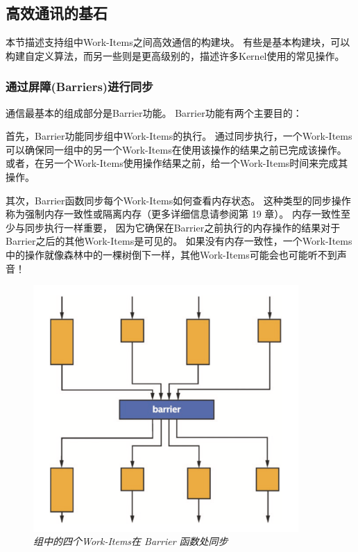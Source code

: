 \subsection{高效通讯的基石}
本节描述支持组中Work-Items之间高效通信的构建块。 
有些是基本构建块，可以构建自定义算法，而另一些则是更高级别的，描述许多Kernel使用的常见操作。

\subsubsection{通过屏障(Barriers)进行同步}
通信最基本的组成部分是Barrier功能。 Barrier功能有两个主要目的：

首先，Barrier功能同步组中Work-Items的执行。 
通过同步执行，一个Work-Items可以确保同一组中的另一个Work-Items在使用该操作的结果之前已完成该操作。 
或者，在另一个Work-Items使用操作结果之前，给一个Work-Items时间来完成其操作。

其次，Barrier函数同步每个Work-Items如何查看内存状态。 
这种类型的同步操作称为强制内存一致性或隔离内存（更多详细信息请参阅第 19 章）。 
内存一致性至少与同步执行一样重要，
因为它确保在Barrier之前执行的内存操作的结果对于Barrier之后的其他Work-Items是可见的。 
如果没有内存一致性，一个Work-Items中的操作就像森林中的一棵树倒下一样，其他Work-Items可能会也可能听不到声音！

\begin{figure}[H]
	\centering
	\includegraphics[width=0.9\textwidth]{figs/F9.2.png}
	\caption{\textit{组中的四个Work-Items在 Barrier 函数处同步 }}
\end{figure}

